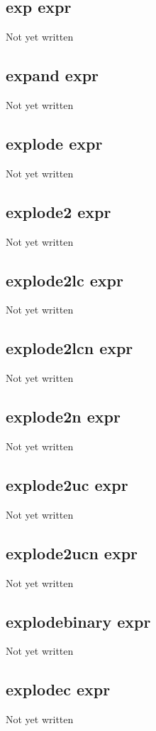 \documentclass[a4paper,11pt]{article}
\begin{document}
{\subsection{\ttfamily exp expr}
Not yet written

\subsection{\ttfamily expand expr}
Not yet written

\subsection{\ttfamily explode expr}
Not yet written

\subsection{\ttfamily explode2 expr}
Not yet written

\subsection{\ttfamily explode2lc expr}
Not yet written

\subsection{\ttfamily explode2lcn expr}
Not yet written

\subsection{\ttfamily explode2n expr}
Not yet written

\subsection{\ttfamily explode2uc expr}
Not yet written

\subsection{\ttfamily explode2ucn expr}
Not yet written

\subsection{\ttfamily explodebinary expr}
Not yet written

\subsection{\ttfamily explodec expr}
Not yet written

}
\end{document}
